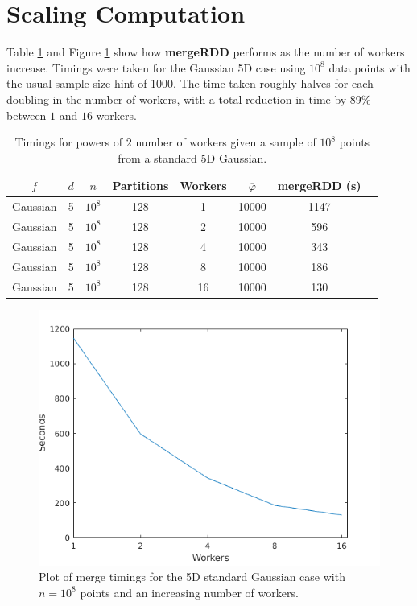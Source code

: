 \documentclass{report}
\begin{document}
\section{Scaling Computation}
Table \ref{scale_table} and Figure \ref{scaling_plot} show how \textbf{mergeRDD} performs as the number of workers increase. Timings were taken for the Gaussian 5D case using $10^8$ data points with the usual sample size hint of 1000. 
The time taken roughly halves for each doubling in the number of workers, with a total reduction in time by 89\% between $1$ and $16$ workers.
\begin{table}[htbp]
\begin{center}
\begin{tabular}{|c  c  c | c | c  | c | c | c |}
	\hline
	$f$ &  $d$ & $n$ & Partitions & Workers & $\overline{\varphi}$  & mergeRDD (s) \\
	\hline
	Gaussian  & 5 & $10^8$ & 128 & 1   & 10000 & 1147 \\
	Gaussian  & 5 & $10^8$ & 128 & 2   & 10000 & 596 \\
	Gaussian  & 5 & $10^8$ & 128 & 4   & 10000 & 343 \\
	Gaussian  & 5 & $10^8$ & 128 & 8   & 10000 & 186 \\
	Gaussian  & 5 & $10^8$ & 128 & 16  & 10000 & 130 \\
	\hline
\end{tabular}
\end{center}
\caption{Timings for powers of $2$ number of workers given a sample of $10^8$ points from a standard 5D Gaussian.}
\label{scale_table}
\end{table}

\begin{figure}[htbp]
\begin{center}
	\includegraphics[scale=0.550]{scalePlot.png}
	\caption{Plot of merge timings for the 5D standard Gaussian case with $n=10^8$ points and an increasing number of workers.}
	\label{scaling_plot}
 \end{center}
\end{figure}
\end{document}

